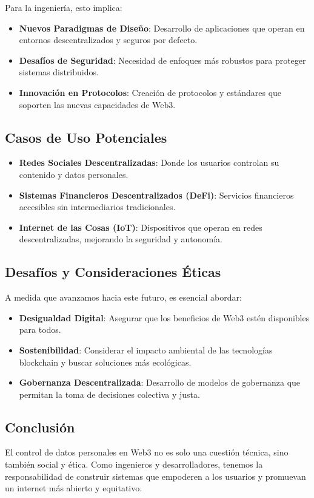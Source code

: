 Para la ingeniería, esto implica:

\begin{itemize}
    \item \textbf{Nuevos Paradigmas de Diseño}: Desarrollo de aplicaciones que operan en entornos descentralizados y seguros por defecto.
    \item \textbf{Desafíos de Seguridad}: Necesidad de enfoques más robustos para proteger sistemas distribuidos.
    \item \textbf{Innovación en Protocolos}: Creación de protocolos y estándares que soporten las nuevas capacidades de Web3.
\end{itemize}

\subsection{Casos de Uso Potenciales}

\begin{itemize}
    \item \textbf{Redes Sociales Descentralizadas}: Donde los usuarios controlan su contenido y datos personales.
    \item \textbf{Sistemas Financieros Descentralizados (DeFi)}: Servicios financieros accesibles sin intermediarios tradicionales.
    \item \textbf{Internet de las Cosas (IoT)}: Dispositivos que operan en redes descentralizadas, mejorando la seguridad y autonomía.
\end{itemize}

\subsection{Desafíos y Consideraciones Éticas}

A medida que avanzamos hacia este futuro, es esencial abordar:

\begin{itemize}
    \item \textbf{Desigualdad Digital}: Asegurar que los beneficios de Web3 estén disponibles para todos.
    \item \textbf{Sostenibilidad}: Considerar el impacto ambiental de las tecnologías blockchain y buscar soluciones más ecológicas.
    \item \textbf{Gobernanza Descentralizada}: Desarrollo de modelos de gobernanza que permitan la toma de decisiones colectiva y justa.
\end{itemize}

\subsection{Conclusión}

El control de datos personales en Web3 no es solo una cuestión técnica, sino también social y ética. Como ingenieros y desarrolladores, tenemos la responsabilidad de construir sistemas que empoderen a los usuarios y promuevan un internet más abierto y equitativo.

